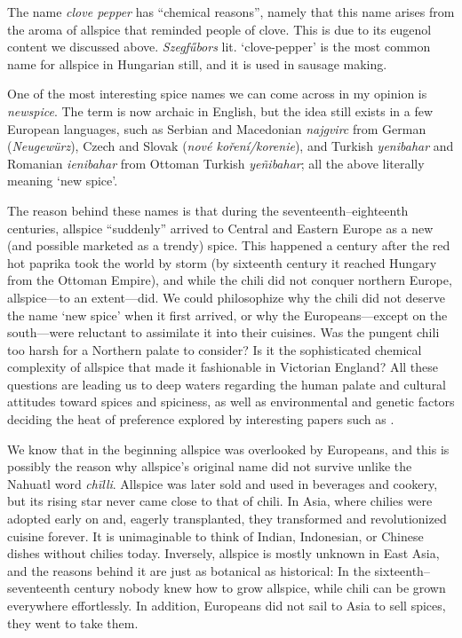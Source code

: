 The name \textit{clove pepper} has ``chemical reasons'', namely that this name arises from the aroma of allspice that reminded people of clove. This is due to its eugenol content we discussed above. \textit{Szegfűbors} lit. `clove-pepper' is the most common name for allspice in Hungarian still, and it is used in sausage making.

One of the most interesting spice names we can come across in my opinion is \textit{newspice}. The term is now archaic in English, but the idea still exists in a few European languages, such as Serbian and Macedonian  \textit{najgvirc} from German (\textit{Neugewürz}), Czech and Slovak (\textit{nové koření/korenie}), and Turkish \textit{yenibahar} and Romanian \textit{ienibahar} from Ottoman Turkish  \textit{yeñibahar}; all the above literally meaning `new spice'.

The reason behind these names is that during the seventeenth--eighteenth centuries, allspice ``suddenly'' arrived to Central and Eastern Europe as a new (and possible marketed as a trendy) spice. This happened a century after the red hot paprika took the world by storm (by sixteenth century it reached Hungary from the Ottoman Empire), and while the chili did not conquer northern Europe, allspice---to an extent---did. We could philosophize why the chili did not deserve the name `new spice' when it first arrived, or why the Europeans---except on the south---were reluctant to assimilate it into their cuisines. Was the pungent chili too harsh for a Northern palate to consider? Is it the sophisticated chemical complexity of allspice that made it fashionable in Victorian England? All these questions are leading us to deep waters regarding the human palate and cultural attitudes toward spices and spiciness, as well as environmental and genetic factors deciding the heat of preference explored by interesting papers such as \textcite{tornwall_why_2012,spence_why_2018}.

We know that in the beginning allspice was overlooked by Europeans, and this is possibly the reason why allspice's original name did not survive unlike the Nahuatl word \textit{chīlli}. Allspice was later sold and used in beverages and cookery, but its rising star never came close to that of chili.
In Asia, where chilies were adopted early on and, eagerly transplanted, they transformed and revolutionized cuisine forever. It is unimaginable to think of Indian, Indonesian, or Chinese dishes without chilies today. Inversely, allspice is mostly unknown in East Asia, and the reasons behind it are just as botanical as historical: In the sixteenth--seventeenth century nobody knew how to grow allspice, while chili can be grown everywhere effortlessly. In addition, Europeans did not sail to Asia to sell spices, they went to take them. 

